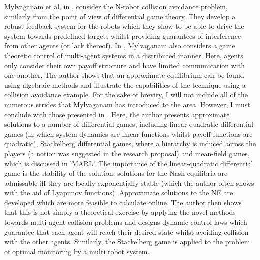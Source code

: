 \documentclass[../sample.tex]{subfiles}
\begin{document}
Mylvaganam et al, in \cite{Mylvaganam2017AutonomousApproach}, consider the N-robot collision
avoidance problem, similarly from the point of view of differential game theory. They develop a
robust feedback system for the robots which they show to be able to drive the system towards
predefined targets whilst providing guarantees of interference from other agents (or lack thereof).
In \cite{MylvaganamASystems}, Mylvaganam also considers a game theoretic control of multi-agent
systems in a distributed manner. Here, agents only consider their own payoff structure and have
limited communication with one another. The author shows that an approximate equilibrium can be
found using algebraic methods and illustrate the capabilities of the technique using a collision
avoidance example. For the sake of brevity, I will not include all of the numerous strides that
Mylvaganam has introduced to the area. However, I must conclude with those presented in
\cite{Mylvaganam2014}. Here, the author presents approximate solutions to a number of differential
games, including linear-quadratic differential games (in which system dynamics are linear functions
whilst payoff functions are quadratic), Stackelberg differential games, where a hierarchy is 
induced across the players (a notion was suggested in the research proposal) and mean-field games,
which is discussed in 'MARL'. The importance of the linear-quadratic
differential game is the stability of the solution; solutions for the Nash equilibria are
admissable iff they are locally exponentially stable (which the author often shows with the aid of
Lyapunov functions). Approximate solutions to the NE are developed which are more feasible to
calculate online. The author then shows that this is not simply a theoretical exercise by applying
the novel methods towards multi-agent collision problems and designs dynamic control laws which
guarantee that each agent will reach their desired state whilst avoiding collision with the other
agents. Similarly, the Stackelberg game is applied to the problem of optimal monitoring by a multi
robot system. 	
\end{document}

